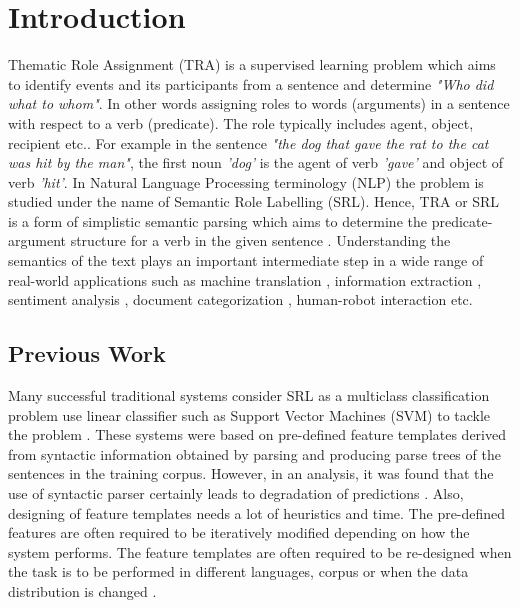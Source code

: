\chapter{Introduction}\label{introduction}

Thematic Role Assignment (TRA) is a supervised learning problem which aims to identify events and its participants from a sentence and determine \textit{"Who did what to whom"}. In other words assigning roles to words (arguments) in a sentence with respect to a verb (predicate). The role typically includes agent, object, recipient etc.. For example in the sentence \textit{"the dog that gave the rat to the cat was hit by the man"}, the first noun \textit{'dog'} is the agent of verb \textit{'gave'} and object of verb \textit{'hit'}. In Natural Language Processing terminology (NLP) the problem is studied under the name of Semantic Role Labelling (SRL). Hence, TRA or SRL is a form of simplistic semantic parsing which aims to determine the predicate-argument structure for a verb in the given sentence \cite{end-to-end}. Understanding the semantics of the text plays an important intermediate step in a wide range of real-world applications such as machine translation \cite{srl:machine_translation}, information extraction \cite{srl:info_extraction:hri}, sentiment analysis \cite{srl:sentiment:wang}, document categorization \cite{srl:text_categorization:persson}, human-robot interaction \cite{tra:xavier_hri,srl:info_extraction:hri} etc.

\section{Previous Work}

Many successful traditional systems consider SRL as a multiclass classification problem use linear classifier such as Support Vector Machines (SVM) to tackle the problem \cite{Koomen:2005,srl:pradhan:2004,pradhan:2005}. These systems were based on pre-defined feature templates derived from syntactic information obtained by parsing and producing parse trees of the sentences in the training corpus. However, in an analysis, it was found that the use of syntactic parser certainly leads to degradation of predictions \cite{pradhan:2005}. Also,  designing of feature templates needs a lot of heuristics and time. The pre-defined features are often required to be iteratively modified depending on how the system performs. The feature templates are often required to be re-designed when the task is to be performed in different languages, corpus or when the data distribution is changed \cite{end-to-end}.

